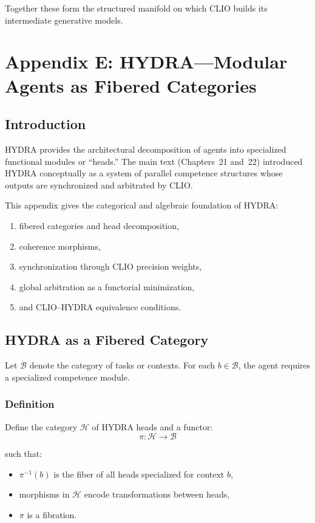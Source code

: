 \documentclass[12pt,oneside]{book}
\theoremstyle{plain}
\theoremstyle{definition}
\begin{document}
Together these form the structured manifold on which CLIO builds its
intermediate generative models.

\chapter{Appendix E: HYDRA---Modular Agents as Fibered Categories}
\label{appendix:HYDRA}

\section{Introduction}

HYDRA provides the architectural decomposition of agents into specialized
functional modules or ``heads.''
The main text (Chapters~21 and~22) introduced HYDRA conceptually as a system of
parallel competence structures whose outputs are synchronized and arbitrated by
CLIO.

This appendix gives the categorical and algebraic foundation of HYDRA:

\begin{enumerate}
    \item fibered categories and head decomposition,
    \item coherence morphisms,
    \item synchronization through CLIO precision weights,
    \item global arbitration as a functorial minimization,
    \item and CLIO--HYDRA equivalence conditions.
\end{enumerate}

\section{HYDRA as a Fibered Category}

Let $\mathcal{B}$ denote the category of tasks or contexts.
For each $b \in \mathcal{B}$, the agent requires a specialized
competence module.

\subsection{Definition}

Define the category $\mathcal{H}$ of HYDRA heads and a functor:
\[
\pi : \mathcal{H} \to \mathcal{B}
\]

such that:

\begin{itemize}
    \item $\pi^{-1}(b)$ is the fiber of all heads specialized for context $b$,
    \item morphisms in $\mathcal{H}$ encode transformations between heads,
    \item $\pi$ is a fibration.
\end{itemize}
\end{document}
